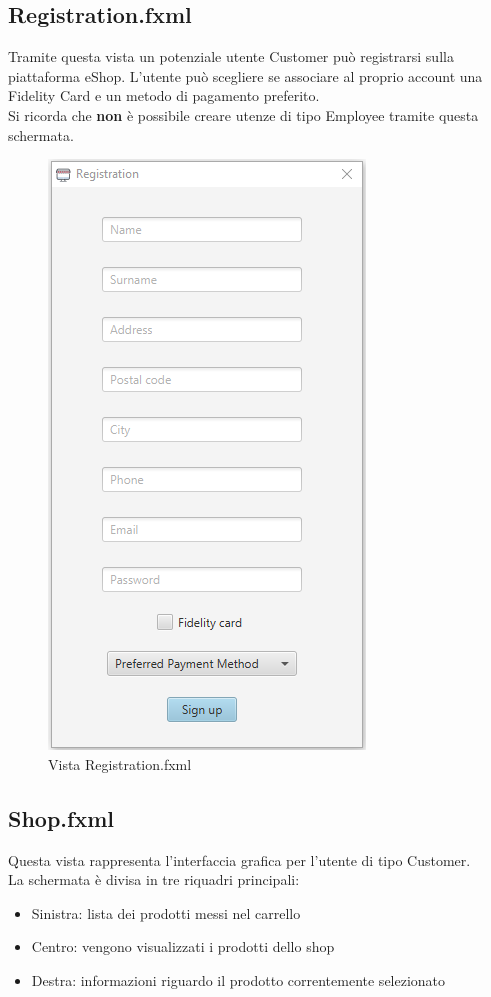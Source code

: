 \documentclass[12pt]{article}
\begin{document}
\subsection{Registration.fxml}
Tramite questa vista un potenziale utente Customer può registrarsi sulla piattaforma eShop. 
L'utente può scegliere se associare al proprio account una Fidelity Card e un metodo di pagamento preferito.
\\
Si ricorda che \textbf{non} è possibile creare utenze di tipo Employee tramite questa schermata.

\begin{figure}[h!]
	\begin{center}
 	 	\includegraphics[keepaspectratio]{media/views/registration.png}
  	 	 \caption{Vista Registration.fxml}
	\end{center}
\end{figure}


\clearpage

\subsection{Shop.fxml}
Questa vista rappresenta l'interfaccia grafica per l'utente di tipo Customer.
\\
La schermata è divisa in tre riquadri principali:
\begin{itemize}
\item Sinistra: lista dei prodotti messi nel carrello
\item Centro: vengono visualizzati i prodotti dello shop
\item Destra: informazioni riguardo il prodotto correntemente selezionato
\end{itemize}
\end{document}
